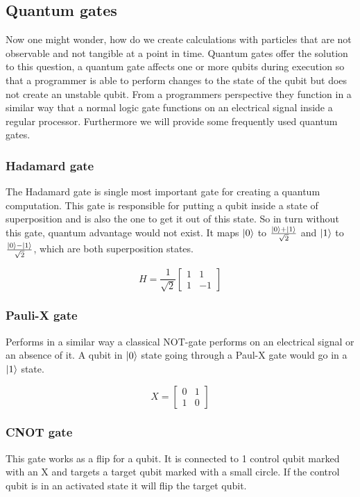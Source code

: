 \subsection{Quantum gates}

Now one might wonder, how do we create calculations with particles that are not observable and not tangible at a point in time. Quantum gates offer the solution to this question, a quantum gate affects one or more qubits during execution so that a programmer is able to perform changes to the state of the qubit but does not create an unstable qubit. From a programmers perspective they function in a similar way that a normal logic gate functions on an electrical signal inside a regular processor. Furthermore we will provide some frequently used quantum gates.

\subsubsection{Hadamard gate}
The Hadamard gate is single most important gate for creating a quantum computation. This gate is responsible for putting a qubit inside a state of superposition and is also the one to get it out of this state. So in turn without this gate, quantum advantage would not exist. It maps  $\ket{0}$ to $\frac{\ket{0} + \ket{1}}{\sqrt{2}}$ and $\ket{1}$ to $\frac{\ket{0}-\ket{1}}{\sqrt{2}}$, which are both superposition states.

\[
H=\frac{1}{\sqrt{2}}\begin{bmatrix}
1 & 1 \\
1 & -1
\end{bmatrix}
\]

\subsubsection{Pauli-X gate}
Performs in a similar way a classical NOT-gate performs on an electrical signal or an absence of it. A qubit in $\ket{0}$ state going through a Paul-X gate would go in a $\ket{1}$ state.

\[
X=
\begin{bmatrix}
0 & 1 \\
1 & 0
\end{bmatrix}
\]

\subsubsection{CNOT gate}
This gate works as a flip for a qubit. It is connected to 1 control qubit marked with an X and targets a target qubit marked with a small circle. If the control qubit is in an activated state it will flip the target qubit.

